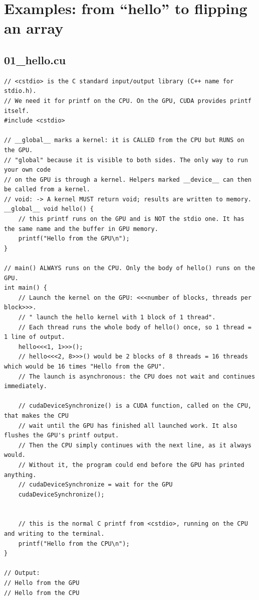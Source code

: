 \documentclass[11pt,a4paper]{article}
\begin{document}
\section{Examples: from ``hello'' to flipping an array}
\subsection{01\_hello.cu}
\begin{lstlisting}[language=CUDA]
// <cstdio> is the C standard input/output library (C++ name for stdio.h).
// We need it for printf on the CPU. On the GPU, CUDA provides printf itself.
#include <cstdio>

// __global__ marks a kernel: it is CALLED from the CPU but RUNS on the GPU.
// "global" because it is visible to both sides. The only way to run your own code
// on the GPU is through a kernel. Helpers marked __device__ can then be called from a kernel.
// void: -> A kernel MUST return void; results are written to memory.
__global__ void hello() {
    // this printf runs on the GPU and is NOT the stdio one. It has the same name and the buffer in GPU memory.
    printf("Hello from the GPU\n");
}

// main() ALWAYS runs on the CPU. Only the body of hello() runs on the GPU.
int main() {
    // Launch the kernel on the GPU: <<<number of blocks, threads per block>>>.
    // " launch the hello kernel with 1 block of 1 thread".
    // Each thread runs the whole body of hello() once, so 1 thread = 1 line of output.
    hello<<<1, 1>>>();
    // hello<<<2, 8>>>() would be 2 blocks of 8 threads = 16 threads which would be 16 times "Hello from the GPU".
    // The launch is asynchronous: the CPU does not wait and continues immediately.

    // cudaDeviceSynchronize() is a CUDA function, called on the CPU, that makes the CPU
    // wait until the GPU has finished all launched work. It also flushes the GPU's printf output.
    // Then the CPU simply continues with the next line, as it always would.
    // Without it, the program could end before the GPU has printed anything.
    // cudaDeviceSynchronize = wait for the GPU
    cudaDeviceSynchronize();


    // this is the normal C printf from <cstdio>, running on the CPU and writing to the terminal.
    printf("Hello from the CPU\n");
}

// Output:
// Hello from the GPU
// Hello from the CPU
\end{lstlisting}
\end{document}
